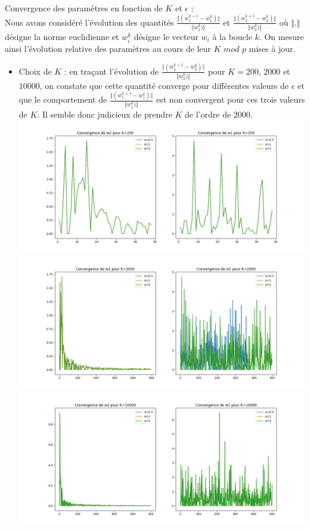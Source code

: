 \documentclass[a4paper,11pt]{article}
\begin{document}
Convergence des paramètres en fonction de $K$ et $\epsilon$ :\\
Nous avons considéré l'évolution des quantités $  \frac{\Vert(w_1^{k+1} - w_1^{k})\Vert}{\Vert w_1^{k})\Vert}$ et $  \frac{\Vert(w_2^{k+1} - w_2^{k})\Vert}{\Vert w_2^{k})\Vert}$ où $\Vert . \Vert$ désigne la norme euclidienne et $w_i^k$ désigne le vecteur $w_i$ à la boucle $k$. On mesure ainsi l'évolution relative des paramètres au cours de leur $K$ $mod$ $p$ mises à jour. 

\begin{itemize}
	\item  Choix de $K$ : en traçant l'évolution de $  \frac{\Vert(w_2^{k+1} - w_2^{k})\Vert}{\Vert w_2^{k})\Vert}$ pour $K = 200$, $2000$ et $10000$, on constate que cette quantité converge pour différentes valeurs de $\epsilon$ et que le comportement de $  \frac{\Vert(w_1^{k+1} - w_1^{k})\Vert}{\Vert w_1^{k})\Vert}$ est non convergent pour ces trois valeurs de $K$. Il semble donc judicieux de prendre $K$ de l'ordre de $2000$. \\

\includegraphics[width=15cm]{"Fig1 Cv K=200"}\\
\includegraphics[width=15cm]{"Fig2 Cv K=2000"}\\
\includegraphics[width=15cm]{"Fig3 Cv K=10000"}\\
	

\end{itemize}
\end{document}
